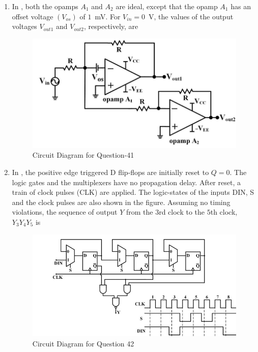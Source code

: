 \documentclass[journal,12pt,onecolumn]{IEEEtran}
\theoremstyle{remark}
\begin{document}
\begin{enumerate}
\item In , both the opamps $A_1$ and $A_2$ are ideal, except that the opamp $A_1$ has an offset voltage $(V_{os})$ of $1$~mV. For $V_{in} = 0$~V, the values of the output voltages $V_{out1}$ and $V_{out2}$, respectively, are
\par\hfill{}
\begin{figure}[H]
    \centering
    \includegraphics[width=0.5\columnwidth]{Figs/Q-41.png}
    \caption{Circuit Diagram for Question-41}
    \label{41}
\end{figure}
    \begin{enumerate}
    \end{enumerate}

\item In , the positive edge triggered D flip-flops are initially reset to $Q=0$. The logic gates and the multiplexers have no propagation delay. After reset, a train of clock pulses (CLK) are applied. The logic-states of the inputs DIN, S and the clock pulses are also shown in the figure. Assuming no timing violations, the sequence of output $Y$ from the $3$rd clock to the $5$th clock, $Y_3 Y_4 Y_5$ is
\par\hfill{}
\begin{figure}[H]
    \centering
    \includegraphics[width=0.5\columnwidth]{Figs/Q-42.png}
    \caption{Circuit Diagram for Question 42}
    \label{42}
\end{figure}
    \begin{enumerate}
    \end{enumerate}


\end{enumerate}
\end{document}
